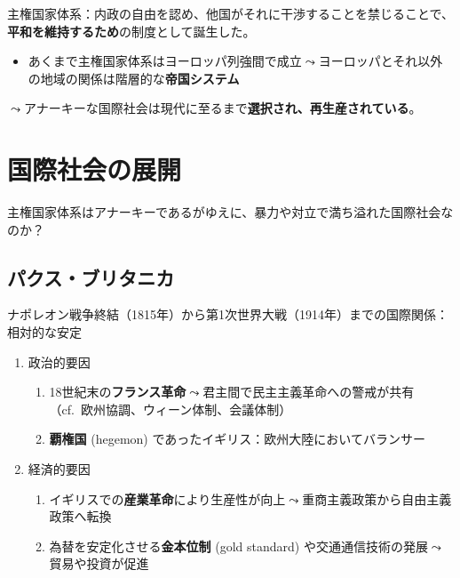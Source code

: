 \documentclass[
  xelatex,
  ja=standard]{bxjsarticle}
\providecommand{\tightlist}{%
  \setlength{\itemsep}{0pt}\setlength{\parskip}{0pt}}\usepackage{longtable,booktabs,array}
\begin{document}
主権国家体系：内政の自由を認め、他国がそれに干渉することを禁じることで、\textbf{平和を維持するため}の制度として誕生した。

\begin{itemize}
\tightlist
\item
  あくまで主権国家体系はヨーロッパ列強間で成立\(\leadsto\)ヨーロッパとそれ以外の地域の関係は階層的な\textbf{帝国システム}
\end{itemize}

\(\leadsto\)アナーキーな国際社会は現代に至るまで\textbf{選択され、再生産されている}\citep{wendt1992, ishida1998}。

\hypertarget{ux56fdux969bux793eux4f1aux306eux5c55ux958b}{%
\section{国際社会の展開}\label{ux56fdux969bux793eux4f1aux306eux5c55ux958b}}

主権国家体系はアナーキーであるがゆえに、暴力や対立で満ち溢れた国際社会なのか？

\hypertarget{ux30d1ux30afux30b9ux30d6ux30eaux30bfux30cbux30ab}{%
\subsection{パクス・ブリタニカ}\label{ux30d1ux30afux30b9ux30d6ux30eaux30bfux30cbux30ab}}

ナポレオン戦争終結（1815年）から第1次世界大戦（1914年）までの国際関係：相対的な安定

\begin{enumerate}
\def\labelenumi{\arabic{enumi}.}
\tightlist
\item
  政治的要因

  \begin{enumerate}
  \def\labelenumii{\arabic{enumii}.}
  \tightlist
  \item
    18世紀末の\textbf{フランス革命}\(\leadsto\)君主間で民主主義革命への警戒が共有（cf.~欧州協調、ウィーン体制、会議体制）
  \item
    \textbf{覇権国} (hegemon)
    であったイギリス：欧州大陸においてバランサー
  \end{enumerate}
\item
  経済的要因

  \begin{enumerate}
  \def\labelenumii{\arabic{enumii}.}
  \tightlist
  \item
    イギリスでの\textbf{産業革命}により生産性が向上\(\leadsto\)重商主義政策から自由主義政策へ転換
  \item
    為替を安定化させる\textbf{金本位制} (gold standard)
    や交通通信技術の発展\(\leadsto\)貿易や投資が促進
  \end{enumerate}
\end{enumerate}
\end{document}
